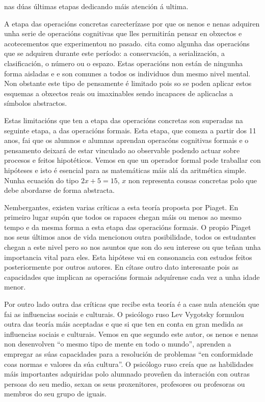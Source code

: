  nas dúas últimas etapas dedicando máis atención á ultima.

A etapa das operacións concretas carecterízase por que os nenos e nenas adquiren unha serie de operacións cognitivas que lles permitirán pensar en obxectos e acotecementos que experimentou no pasado.  cita como algunha das operacións que se adquiren durante este período: a conservación, a serialización, a clasificación, o número ou o espazo. Estas operacións non están de ningunha forma aisladas e e son comunes a todos os individuos dun mesmo nivel mental. Non obstante este tipo de pensamente é limitado pois so se poden aplicar estos esquemas a obxectos reais ou imaxinables sendo incapaces de aplicaclas a símbolos abstractos.

Estas limitacións que ten a etapa das operacións concretas son superadas na seguinte etapa, a das operacións formais. Esta etapa, que comeza a partir dos 11 anos, fai que os alumnos e alumnas aprendan operacóns cognitivas formais e o pensamento deixará de estar vinculado ao observable podendo actuar sobre procesos e feitos hipotéticos. Vemos en \cite{shaffer2000psicologia} que un operador formal pode traballar con hipóteses e isto é esencial para as matemáticas máis alá da aritmética simple. Nunha ecuación do tipo $2x + 5 = 15$, $x$ non representa cousas concretas polo que debe abordarse de forma abstracta.

Nembergantes, existen varias críticas a esta teoría proposta por Piaget. En primeiro lugar supón que todos os rapaces chegan máis ou menos ao mesmo tempo e da mesma forma a esta etapa das operacións formais. O propio Piaget nos seus últimos anos de vida mencionou outra posibilidade, todos os estudantes chegan a este nivel pero so nos asuntos que son do seu interese ou que teñan unha importancia vital para eles. Esta hipótese vai en consonancia con estudos feitos posteriormente por outros autores.  En \cite{shaffer2000psicologia} cítase outro dato interesante pois as capacidades que implican as operacións formais adquírense cada vez a unha idade menor.

Por outro lado outra das críticas que recibe esta teoría é a case nula atención que fai as influencias sociais e culturais. O psicólogo ruso Lev Vygotsky formulou outra das teoría máis aceptadas e que si que ten en conta en gran medida as influencias sociais e culturais. Vemos en \cite[p.~274]{shaffer2000psicologia} que segundo este autor, os nenos e nenas non desenvolven ``o mesmo tipo de mente en todo o mundo'', aprenden a empregar as súas capacidades para a resolución de problemas ``en conformidade coas normas e valores da súa cultura''. O psicólogo ruso creía que as habilidades máis importantes adquiridas polo alumnado proveñen da interación con outras persoas do seu medio, sexan os seus proxenitores, profesores ou profesoras ou membros do seu grupo de iguais.

